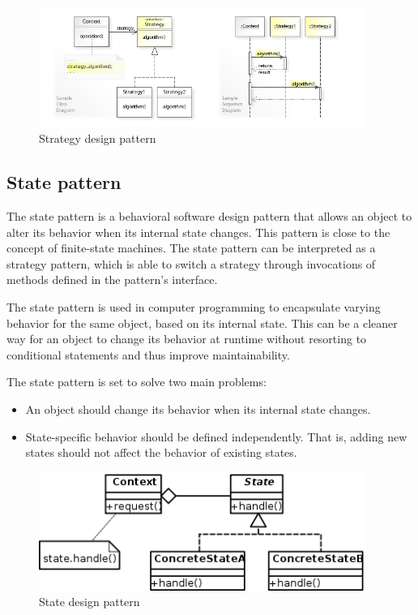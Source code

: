 \begin{figure}[h]
\caption{Strategy design pattern}
\centering
\includegraphics[width=0.95\textwidth]{images/strategyDesignPattern.jpg}
\end{figure}

\subsection{State pattern}

The state pattern is a behavioral software design pattern that allows an object to alter its behavior when its internal state changes. This pattern is close to the concept of finite-state machines. The state pattern can be interpreted as a strategy pattern, which is able to switch a strategy through invocations of methods defined in the pattern's interface.

The state pattern is used in computer programming to encapsulate varying behavior for the same object, based on its internal state. This can be a cleaner way for an object to change its behavior at runtime without resorting to conditional statements and thus improve maintainability.

The state pattern is set to solve two main problems:
\begin{itemize}
        \item An object should change its behavior when its internal state changes.
        \item State-specific behavior should be defined independently. That is, adding new states should not affect the behavior of existing states.
\end{itemize}

\begin{figure}[h]
\caption{State design pattern}
\centering
\includegraphics[width=0.95\textwidth]{images/stateDesignPattern.png}
\end{figure}

